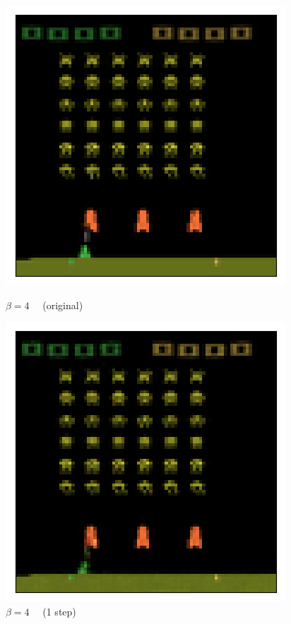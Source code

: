 \begin{figure}[h!]
\begin{multicols}{4}
    \includegraphics[scale=0.4]{figures/results/colour_separated/beta_4_posterior_sample_original.png}
    \caption{$\beta=4\quad$ (original)}
    \includegraphics[scale=0.4]{figures/results/colour_separated/beta_4_posterior_sample_1.png}
    \caption{$\beta=4\quad$ (1 step)}

\end{multicols}
\end{figure}
